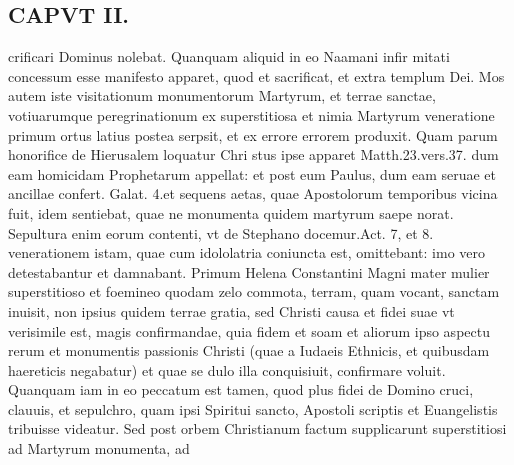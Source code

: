 \documentclass{article}
\begin{document}
\begin{pages}
\section*{CAPVT  II. }
\marginpar{[ p.69 ]}\pstart crificari Dominus nolebat. Quanquam aliquid in eo Naamani infir mitati concessum esse manifesto apparet, quod et sacrificat, et extra templum Dei. Mos autem iste visitationum monumentorum Martyrum, et terrae sanctae, votiuarumque peregrinationum ex superstitiosa et nimia Martyrum veneratione primum ortus latius postea serpsit, et ex errore errorem produxit. Quam parum honorifice de Hierusalem loquatur Chri stus ipse apparet Matth.23.vers.37. dum eam homicidam Prophetarum appellat: et post eum Paulus, dum eam seruae et ancillae confert. Galat. 4.et sequens aetas, quae Apostolorum temporibus vicina fuit, idem sentiebat, quae ne monumenta quidem martyrum saepe norat. Sepultura enim eorum contenti, vt de Stephano docemur.Act. 7, et 8. venerationem istam, quae cum idololatria coniuncta est, omittebant: imo vero detestabantur et damnabant. Primum Helena Constantini Magni mater mulier superstitioso et foemineo quodam zelo commota, terram, quam vocant, sanctam inuisit, non ipsius quidem terrae gratia, sed Christi causa et fidei suae vt verisimile est, magis confirmandae, quia fidem et soam et aliorum ipso aspectu rerum et monumentis passionis Christi (quae a Iudaeis Ethnicis, et quibusdam haereticis negabatur) et quae se dulo illa conquisiuit, confirmare voluit. Quanquam iam in eo peccatum est tamen, quod plus fidei de Domino cruci, clauuis, et sepulchro, quam ipsi Spiritui sancto, Apostoli scriptis et Euangelistis tribuisse videatur. Sed post orbem Christianum factum supplicarunt superstitiosi ad Martyrum monumenta, ad  \pend

\end{pages}
\end{document}
